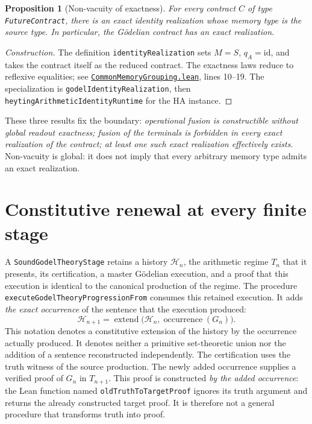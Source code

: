 \documentclass[11pt,a4paper]{article}
\newcommand{\code}[1]{\nolinkurl{#1}}
\newcommand{\SourceAt}[3]{\href{https://github.com/JohnDoe-collab-stack/relational-perimeter/blob/1e5aeda745559d62a3819bb3213da7fce3c31ad1/#1\#L#2}{\nolinkurl{#3}}}
\newtheorem{proposition}[theorem]{Proposition}
\theoremstyle{remark}
\begin{document}
\begin{proposition}[Non-vacuity of exactness]
For every contract $C$ of type \code{FutureContract}, there is an exact
identity realization whose memory type is the source type. In particular,
the Gödelian contract has an exact realization.
\end{proposition}
\begin{proof}[Construction]
The definition \code{identityRealization} sets
$M=S$, $q_A=\mathrm{id}$, and takes the contract itself as the reduced
contract. The exactness laws reduce to reflexive equalities; see
\SourceAt{RelationalPerimeter/Constitution/Continuation/CommonMemoryGrouping.lean}{10-L19}{CommonMemoryGrouping.lean},
lines 10--19. The specialization is \code{godelIdentityRealization}, then
\code{heytingArithmeticIdentityRuntime} for the HA instance.
\end{proof}

These three results fix the boundary: \emph{operational fusion is
constructible without global readout exactness; fusion of the terminals is
forbidden in every exact realization of the contract; at least one such
exact realization effectively exists}. Non-vacuity is global: it does not
imply that every arbitrary memory type admits an exact realization.

\section{Constitutive renewal at every finite stage}
\label{sec:progression}

A \code{SoundGodelTheoryStage} retains a history $\mathcal H_n$, the
arithmetic regime $T_n$ that it presents, its certification, a master
Gödelian execution, and a proof that this execution is identical to the
canonical production of the regime. The procedure
\code{executeGodelTheoryProgressionFrom} consumes this retained execution.
It adds \emph{the exact occurrence} of the sentence that the execution
produced:
\begin{equation}\label{eq:successor}
\mathcal H_{n+1}
  =\operatorname{extend}\bigl(\mathcal H_n,
    \operatorname{occurrence}(G_n)\bigr).
\end{equation}
This notation denotes a constitutive extension of the history by the
occurrence actually produced. It denotes neither a primitive set-theoretic
union nor the addition of a sentence reconstructed independently. The
certification uses the truth witness of the source production. The newly
added occurrence supplies a verified proof of $G_n$ in $T_{n+1}$. This
proof is constructed \emph{by the added occurrence}: the Lean function
named \code{oldTruthToTargetProof} ignores its truth argument and returns
the already constructed target proof. It is therefore not a general
procedure that transforms truth into proof.
\end{document}
